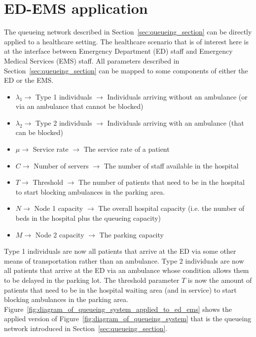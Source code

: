 \section{ED-EMS application}\label{sec:queueing_ems_ed_application}

The queueing network described in Section~\ref{sec:queueing_section} can be
directly applied to a healthcare setting.
The healthcare scenario that is of interest here is at the interface between
Emergency Department (ED) staff and Emergency Medical Services (EMS) staff.
All parameters described in Section~\ref{sec:queueing_section} can be mapped
to some components of either the ED or the EMS.

\begin{itemize}
    \item \(\lambda_1 \rightarrow\) Type 1 individuals \(\rightarrow\)
    Individuals arriving without an ambulance (or via an ambulance that cannot
    be blocked)
    \item \(\lambda_2 \rightarrow\) Type 2 individuals \(\rightarrow\)
    Individuals arriving with an ambulance (that can be blocked)
    \item \(\mu \rightarrow\) Service rate \(\rightarrow\) The service rate of a
    patient
    \item \(C \rightarrow\) Number of servers \(\rightarrow\) The number of
    staff available in the hospital
    \item \(T \rightarrow\) Threshold \(\rightarrow\) The number of patients that
    need to be in the hospital to start blocking ambulances in the parking area.
    \item \(N \rightarrow\) Node 1 capacity \(\rightarrow\) The overall hospital
    capacity (i.e. the number of beds in the hospital plus the queueing
    capacity)
    \item \(M \rightarrow\) Node 2 capacity \(\rightarrow\) The parking capacity
\end{itemize}

Type 1 individuals are now all patients that arrive at the ED via
some other means of transportation rather than an ambulance.
Type 2 individuals are now all patients that arrive at the ED via an ambulance
whose condition allows them to be delayed in the parking lot.
The threshold parameter \(T\) is now the amount of patients that need to be in
the hospital waiting area (and in service) to start blocking ambulances in the
parking area.
Figure~\ref{fig:diagram_of_queueing_system_applied_to_ed_ems} shows the applied
version of Figure~\ref{fig:diagram_of_queueing_system} that is the queueing
network introduced in Section~\ref{sec:queueing_section}.

